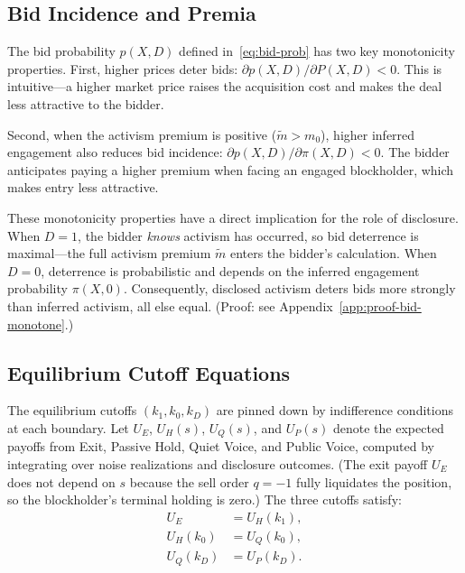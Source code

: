 \subsection{Bid Incidence and Premia}

The bid probability $p(X,D)$ defined in~\eqref{eq:bid-prob} has two key monotonicity properties. First, higher prices deter bids: $\partial p(X,D)/\partial P(X,D)<0$. This is intuitive---a higher market price raises the acquisition cost and makes the deal less attractive to the bidder.

Second, when the activism premium is positive ($\tilde{m}>m_0$), higher inferred engagement also reduces bid incidence: $\partial p(X,D)/\partial\pi(X,D)<0$. The bidder anticipates paying a higher premium when facing an engaged blockholder, which makes entry less attractive.

These monotonicity properties have a direct implication for the role of disclosure. When $D=1$, the bidder \emph{knows} activism has occurred, so bid deterrence is maximal---the full activism premium $\tilde{m}$ enters the bidder's calculation. When $D=0$, deterrence is probabilistic and depends on the inferred engagement probability $\pi(X,0)$. Consequently, disclosed activism deters bids more strongly than inferred activism, all else equal. (Proof: see Appendix~\ref{app:proof-bid-monotone}.)

\subsection{Equilibrium Cutoff Equations}

The equilibrium cutoffs $(k_1,k_0,k_D)$ are pinned down by indifference conditions at each boundary. Let $U_E$, $U_H(s)$, $U_Q(s)$, and $U_P(s)$ denote the expected payoffs from Exit, Passive Hold, Quiet Voice, and Public Voice, computed by integrating over noise realizations and disclosure outcomes. (The exit payoff $U_E$ does not depend on $s$ because the sell order $q=-1$ fully liquidates the position, so the blockholder's terminal holding is zero.) The three cutoffs satisfy:
\begin{align}
U_E &= U_H(k_1), \label{eq:k1} \\
U_H(k_0) &= U_Q(k_0), \label{eq:k0} \\
U_Q(k_D) &= U_P(k_D). \label{eq:kD}
\end{align}

